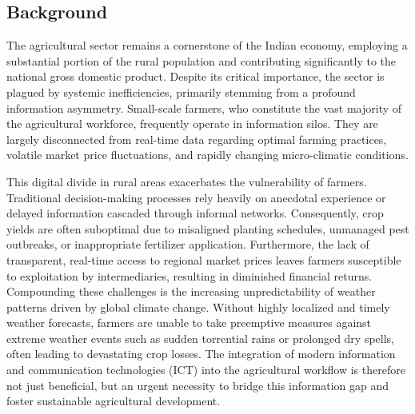 \subsection{Background}
The agricultural sector remains a cornerstone of the Indian economy, employing a substantial portion of the rural population and contributing significantly to the national gross domestic product. Despite its critical importance, the sector is plagued by systemic inefficiencies, primarily stemming from a profound information asymmetry. Small-scale farmers, who constitute the vast majority of the agricultural workforce, frequently operate in information silos. They are largely disconnected from real-time data regarding optimal farming practices, volatile market price fluctuations, and rapidly changing micro-climatic conditions. 

This digital divide in rural areas exacerbates the vulnerability of farmers. Traditional decision-making processes rely heavily on anecdotal experience or delayed information cascaded through informal networks. Consequently, crop yields are often suboptimal due to misaligned planting schedules, unmanaged pest outbreaks, or inappropriate fertilizer application. Furthermore, the lack of transparent, real-time access to regional market prices leaves farmers susceptible to exploitation by intermediaries, resulting in diminished financial returns. Compounding these challenges is the increasing unpredictability of weather patterns driven by global climate change. Without highly localized and timely weather forecasts, farmers are unable to take preemptive measures against extreme weather events such as sudden torrential rains or prolonged dry spells, often leading to devastating crop losses. The integration of modern information and communication technologies (ICT) into the agricultural workflow is therefore not just beneficial, but an urgent necessity to bridge this information gap and foster sustainable agricultural development.

